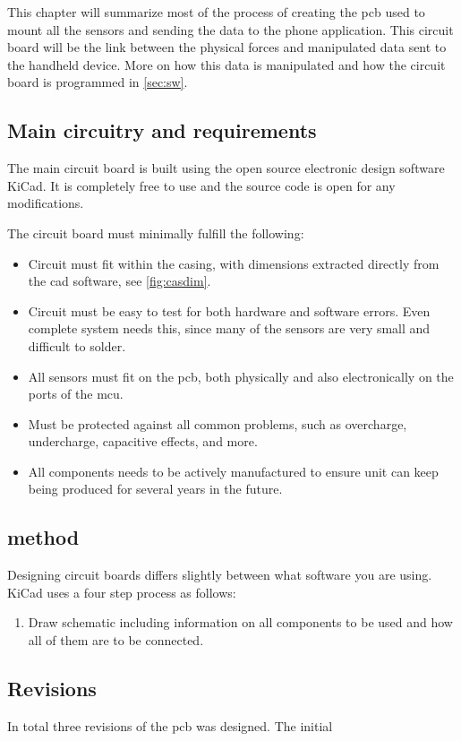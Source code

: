 This chapter will summarize most of the process of creating the \gls{pcb} used to mount all the sensors and sending the data to the phone application. This circuit board will be the link between the physical forces and manipulated data sent to the handheld device. More on how this data is manipulated and how the circuit board is programmed in \autoref{sec:sw}. 

\subsection{Main circuitry and requirements}\label{sec:hw:req}
The main circuit board is built using the open source electronic design software KiCad\cite{kicad}. It is completely free to use and the source code is open for any modifications.

The circuit board must minimally fulfill the following:
\begin{itemize}
\item Circuit must fit within the casing, with dimensions extracted directly from the cad software\cite{cad}, see \autoref{fig:casdim}.
\item Circuit must be easy to test for both hardware and software errors. Even complete system needs this, since many of the sensors are very small and difficult to solder.
\item All sensors must fit on the \gls{pcb}, both physically and also electronically on the ports of the \gls{mcu}.
\item Must be protected against all common problems, such as overcharge, undercharge, capacitive effects, and more.
\item All components needs to be actively manufactured to ensure unit can keep being produced for several years in the future.
\end{itemize}

\subsection{method}
Designing circuit boards differs slightly between what software you are using. KiCad\cite{kicad} uses a four step process as follows:
\begin{enumerate}
\item Draw schematic including information on all components to be used and how all of them are to be connected. 
\end{enumerate}

\subsection{Revisions}\label{sec:hw:rev}
In total three revisions of the \gls{pcb} was designed. The initial 

